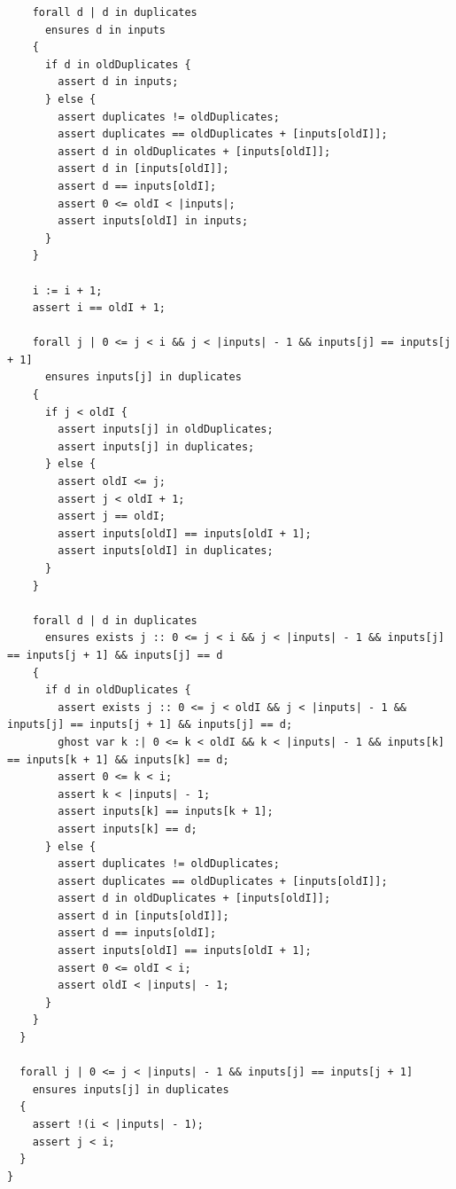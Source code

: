 \documentclass{article}
\begin{document}
\begin{lstlisting}
    forall d | d in duplicates
      ensures d in inputs
    {
      if d in oldDuplicates {
        assert d in inputs;
      } else {
        assert duplicates != oldDuplicates;
        assert duplicates == oldDuplicates + [inputs[oldI]];
        assert d in oldDuplicates + [inputs[oldI]];
        assert d in [inputs[oldI]];
        assert d == inputs[oldI];
        assert 0 <= oldI < |inputs|;
        assert inputs[oldI] in inputs;
      }
    }

    i := i + 1;
    assert i == oldI + 1;

    forall j | 0 <= j < i && j < |inputs| - 1 && inputs[j] == inputs[j + 1]
      ensures inputs[j] in duplicates
    {
      if j < oldI {
        assert inputs[j] in oldDuplicates;
        assert inputs[j] in duplicates;
      } else {
        assert oldI <= j;
        assert j < oldI + 1;
        assert j == oldI;
        assert inputs[oldI] == inputs[oldI + 1];
        assert inputs[oldI] in duplicates;
      }
    }

    forall d | d in duplicates
      ensures exists j :: 0 <= j < i && j < |inputs| - 1 && inputs[j] == inputs[j + 1] && inputs[j] == d
    {
      if d in oldDuplicates {
        assert exists j :: 0 <= j < oldI && j < |inputs| - 1 && inputs[j] == inputs[j + 1] && inputs[j] == d;
        ghost var k :| 0 <= k < oldI && k < |inputs| - 1 && inputs[k] == inputs[k + 1] && inputs[k] == d;
        assert 0 <= k < i;
        assert k < |inputs| - 1;
        assert inputs[k] == inputs[k + 1];
        assert inputs[k] == d;
      } else {
        assert duplicates != oldDuplicates;
        assert duplicates == oldDuplicates + [inputs[oldI]];
        assert d in oldDuplicates + [inputs[oldI]];
        assert d in [inputs[oldI]];
        assert d == inputs[oldI];
        assert inputs[oldI] == inputs[oldI + 1];
        assert 0 <= oldI < i;
        assert oldI < |inputs| - 1;
      }
    }
  }

  forall j | 0 <= j < |inputs| - 1 && inputs[j] == inputs[j + 1]
    ensures inputs[j] in duplicates
  {
    assert !(i < |inputs| - 1);
    assert j < i;
  }
}
\end{lstlisting}
\end{document}
